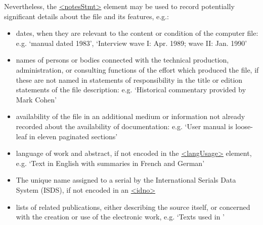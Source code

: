 Nevertheless, the \hyperref[TEI.notesStmt]{<notesStmt>} element may be used to record potentially significant details about the file and its features, e.g.: \begin{itemize}
\item dates, when they are relevant to the content or condition of the computer file: e.g. ‘manual dated 1983’, ‘Interview wave I: Apr. 1989; wave II: Jan. 1990’
\item names of persons or bodies connected with the technical production, administration, or consulting functions of the effort which produced the file, if these are not named in statements of responsibility in the title or edition statements of the file description: e.g. ‘Historical commentary provided by Mark Cohen’
\item availability of the file in an additional medium or information not already recorded about the availability of documentation: e.g. ‘User manual is loose-leaf in eleven paginated sections’
\item language of work and abstract, if not encoded in the \hyperref[TEI.langUsage]{<langUsage>} element, e.g. ‘Text in English with summaries in French and German’
\item The unique name assigned to a serial by the International Serials Data System (ISDS), if not encoded in an \hyperref[TEI.idno]{<idno>}
\item lists of related publications, either describing the source itself, or concerned with the creation or use of the electronic work, e.g. ‘Texts used in \cite{HD-BIBL-2}’
\end{itemize} \par

